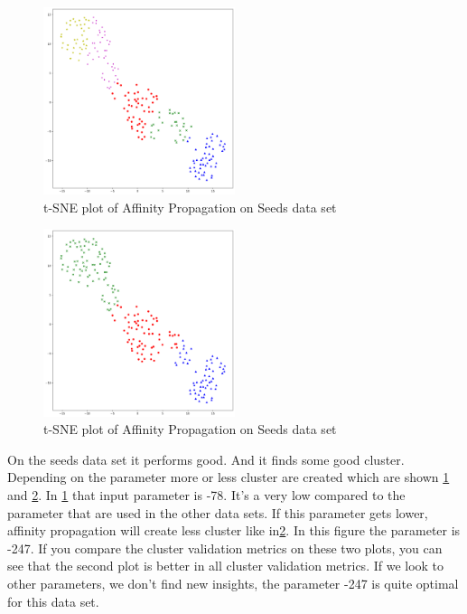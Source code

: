 \begin{figure}[H]
	\begin{center}
		\includegraphics[width=0.5\textwidth]{images/af_seed78.png}
	\end{center}
	\caption{t-SNE plot of Affinity Propagation on Seeds data set}
	\label{fig:af_seeds78}
\end{figure}

\begin{figure}[H]
	\begin{center}
		\includegraphics[width=0.5\textwidth]{images/af_seeds247.png}
	\end{center}
	\caption{t-SNE plot of Affinity Propagation on Seeds data set}
	\label{fig:af_seeds2}
\end{figure}

On the seeds data set it performs good. And it finds some good cluster. Depending on the parameter more or less cluster are created which are shown \ref{fig:af_seeds78} and \ref{fig:af_seeds2}. In \ref{fig:af_seeds78} that input parameter is -78. It’s a very low compared to the parameter that are used in the other data sets. If this parameter gets lower, affinity propagation will create less cluster like in\ref{fig:af_seeds2}. In this figure the parameter is -247. If you compare the cluster validation metrics on these two plots, you can see that the second plot is better in all cluster validation metrics. If we look to other parameters, we don’t find new insights, the parameter -247 is quite optimal for this data set. 


